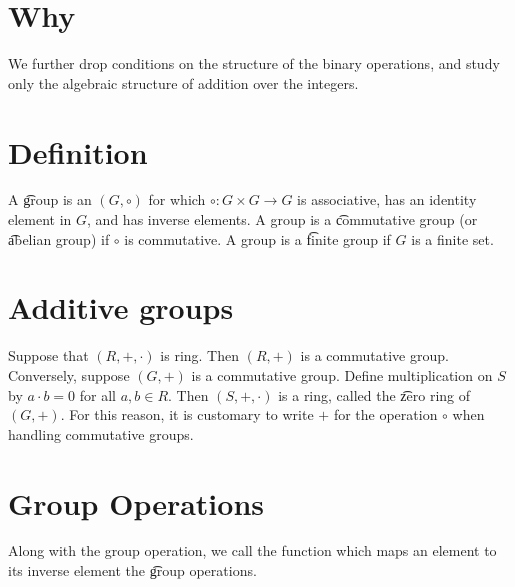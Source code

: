 
\section*{Why}


We further drop conditions on the structure of the binary operations, and study only the algebraic structure of addition over the integers.

\section*{Definition}

A \t{group} is an $(G, \circ)$ for which $\circ: G \times  G \to G$ is associative, has an identity element in $G$, and has inverse elements.
A group is a \t{commutative group} (or \t{abelian group}) if $\circ$ is commutative.
A group is a \t{finite group} if $G$ is a finite set.

\section*{Additive groups}

Suppose that $(R, +, \cdot )$ is ring.
Then $(R, +)$ is a commutative group.
Conversely, suppose $(G, +)$ is a commutative group.
Define multiplication on $S$ by $a\cdot b = 0$ for all $a, b \in R$.
Then $(S, +, \cdot )$ is a ring, called the \t{zero ring} of $(G, +)$.
For this reason, it is customary to write $+$ for the operation $\circ$ when handling commutative groups.

\section*{Group Operations}

Along with the group operation, we call the function which maps an element to its inverse element the \t{group operations}.

\blankpage

